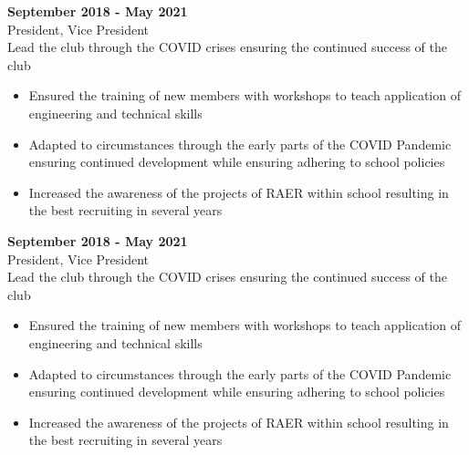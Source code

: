 {    \noindent\begin{minipage}{\linewidth}
 \hfill \textbf{September 2018 - May 2021}\\
President, Vice President\hfill \\Lead the club through the COVID crises ensuring the continued success of the club
\begin{itemize}[noitemsep,nolistsep]
\item Ensured the training of new members with workshops to teach application of engineering and technical skills
\item Adapted to circumstances through the early parts of the COVID  Pandemic ensuring continued development while ensuring adhering to school policies
\item Increased the awareness of the projects of RAER within school resulting in the best recruiting in several years
\end{itemize}


\end{minipage}
\vspace{\entrySpacing}

    \noindent\begin{minipage}{\linewidth}
 \hfill \textbf{September 2018 - May 2021}\\
President, Vice President\hfill \\Lead the club through the COVID crises ensuring the continued success of the club
\begin{itemize}[noitemsep,nolistsep]
\item Ensured the training of new members with workshops to teach application of engineering and technical skills
\item Adapted to circumstances through the early parts of the COVID  Pandemic ensuring continued development while ensuring adhering to school policies
\item Increased the awareness of the projects of RAER within school resulting in the best recruiting in several years
\end{itemize}


\end{minipage}
\vspace{\entrySpacing}

}
